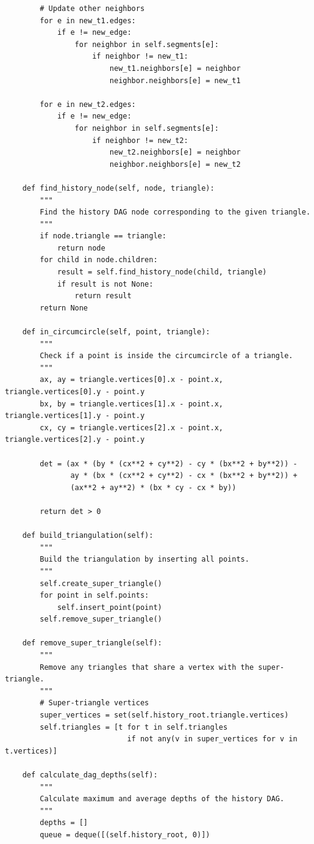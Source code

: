 \documentclass{article}
\begin{document}
\begin{verbatim}
        # Update other neighbors
        for e in new_t1.edges:
            if e != new_edge:
                for neighbor in self.segments[e]:
                    if neighbor != new_t1:
                        new_t1.neighbors[e] = neighbor
                        neighbor.neighbors[e] = new_t1

        for e in new_t2.edges:
            if e != new_edge:
                for neighbor in self.segments[e]:
                    if neighbor != new_t2:
                        new_t2.neighbors[e] = neighbor
                        neighbor.neighbors[e] = new_t2

    def find_history_node(self, node, triangle):
        """
        Find the history DAG node corresponding to the given triangle.
        """
        if node.triangle == triangle:
            return node
        for child in node.children:
            result = self.find_history_node(child, triangle)
            if result is not None:
                return result
        return None

    def in_circumcircle(self, point, triangle):
        """
        Check if a point is inside the circumcircle of a triangle.
        """
        ax, ay = triangle.vertices[0].x - point.x, triangle.vertices[0].y - point.y
        bx, by = triangle.vertices[1].x - point.x, triangle.vertices[1].y - point.y
        cx, cy = triangle.vertices[2].x - point.x, triangle.vertices[2].y - point.y

        det = (ax * (by * (cx**2 + cy**2) - cy * (bx**2 + by**2)) -
               ay * (bx * (cx**2 + cy**2) - cx * (bx**2 + by**2)) +
               (ax**2 + ay**2) * (bx * cy - cx * by))

        return det > 0

    def build_triangulation(self):
        """
        Build the triangulation by inserting all points.
        """
        self.create_super_triangle()
        for point in self.points:
            self.insert_point(point)
        self.remove_super_triangle()

    def remove_super_triangle(self):
        """
        Remove any triangles that share a vertex with the super-triangle.
        """
        # Super-triangle vertices
        super_vertices = set(self.history_root.triangle.vertices)
        self.triangles = [t for t in self.triangles 
                            if not any(v in super_vertices for v in t.vertices)]

    def calculate_dag_depths(self):
        """
        Calculate maximum and average depths of the history DAG.
        """
        depths = []
        queue = deque([(self.history_root, 0)])


\end{verbatim}
\end{document}
